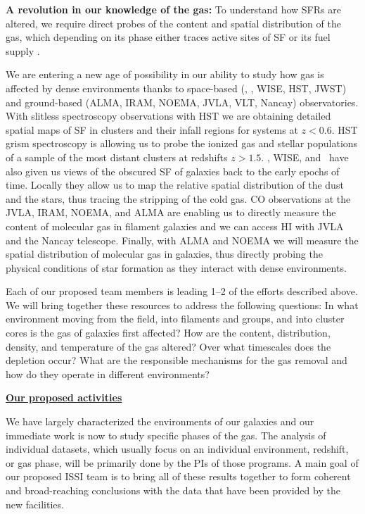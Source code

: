 \documentclass[11pt]{article}
\begin{document}
\textbf{A revolution in our knowledge of the gas:} To understand how SFRs are altered, we require direct probes of the content and spatial distribution of the gas, which depending on its phase either traces active sites of SF or its fuel supply  \citep[e.g.][]{Kennicutt98b,Bigiel08,Leroy08}. 

We are entering a new age of possibility in our ability to study how gas is affected by
dense environments thanks to space-based (\spitzer, \herschel, WISE, HST,
JWST) and ground-based (ALMA, IRAM, NOEMA, JVLA, VLT, Nancay)
observatories.  With slitless spectroscopy
observations with HST we are obtaining detailed spatial
maps of SF in clusters and their infall regions for
systems at $z<0.6$.  HST grism spectroscopy is allowing us to probe
the ionized gas and stellar populations of a sample of the most
distant clusters at redshifts $z>1.5$.  \spitzer, WISE, and \herschel\ have
also given us views of the obscured SF of galaxies back to
the early epochs of time.  Locally they allow us to map the relative
spatial distribution of the dust and the stars, thus tracing the
stripping of the cold gas.  CO observations at the JVLA, IRAM, NOEMA,
and ALMA are enabling us to directly measure the content of molecular
gas in filament galaxies and we can access HI with JVLA and the Nancay telescope.  Finally, with ALMA and NOEMA we will measure the spatial distribution of molecular gas in
galaxies, thus directly probing the physical conditions of star
formation as they interact with dense environments.

Each of our proposed team members is leading 1--2 of the efforts
described above.  We will bring together these resources to
address the following questions: In what environment moving from the
field, into filaments and groups, and into cluster cores is the gas of galaxies
first affected?  How are the content, distribution, density,
and temperature of the gas altered?  Over what timescales does the
depletion occur?  What are the responsible mechanisms for the gas
removal and how do they operate in different environments?  

\centerline{{\bf \underline{ Our proposed activities}}}

We have largely characterized the environments of our galaxies and our immediate work is now to study specific phases of the gas.  The analysis of individual datasets, which usually focus on an individual environment, redshift, or gas phase, will be primarily done by the PIs of those programs.  
A main goal of our proposed ISSI team is to bring all of these results together to form coherent and broad-reaching conclusions with the data that have been provided by the new facilities.
\end{document}
